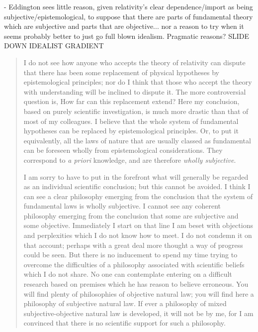 - Eddington sees little reason, given relativity's clear dependence/import as being subjective/epistemological, to suppose that there are parts of fundamental theory which are subjective and parts that are objective... nor a reason to try when it seems probably better to just go full blown idealism.  Pragmatic reasons?  SLIDE DOWN IDEALIST GRADIENT

\begin{quote}
    I do not see how anyone who accepts the theory of relativity can dispute that there has been some replacement of physical hypotheses by epistemological principles; nor do I think that those who accept the theory with understanding will be inclined to dispute it.  The more controversial question is, How far can this replacement extend?  Here my conclusion, based on purely scientific investigation, is much more drastic than that of most of my colleagues.  I believe that the whole system of fundamental hypotheses can be replaced by epistemological principles.  Or, to put it equivalently, all the laws of nature that are usually classed as fundamental can be foreseen wholly from epistemological considerations.  They correspond to \emph{a priori} knowledge, and are therefore \emph{wholly subjective}.
    
    I am sorry to have to put in the forefront what will generally be regarded as an individual scientific conclusion; but this cannot be avoided.  I think I can see a clear philosophy emerging from the conclusion that the system of fundamental laws is wholly subjective.  I cannot see any coherent philosophy emerging from the conclusion that some are subjective and some objective.  Immediately I start on that line I am beset with objections and perplexities which I do not know how to meet.  I do not condemn it on that account; perhaps with a great deal more thought a way of progress could be seen.  But there is no inducement to spend my time trying to overcome the difficulties of a philosophy associated with scientific beliefs which I do not share.  No one can contemplate entering on a difficult research based on premises which he has reason to believe erroneous.  You will find plenty of philosophies of objective natural law; you will find here a philosophy of subjective natural law.  If ever a philosophy of mixed subjective-objective natural law is developed, it will not be by me, for I am convinced that there is no scientific support for such a philosophy.
    
    \citep[p. 56-57]{Eddington1939}
\end{quote}

